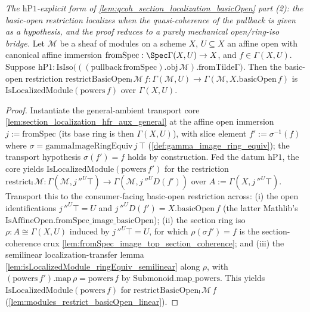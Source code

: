 \begin{lemma}

  \label{lem:isLocalizedModule_basicOpen_of_hP1}
  \textit{The $\mathrm{hP1}$-explicit form of \cref{lem:qcoh_section_localization_basicOpen} part (2):
  the basic-open restriction localizes when the quasi-coherence of the pullback is given as a hypothesis,
  and the proof reduces to a purely mechanical open/ring-iso bridge.}
  Let \(\mathcal{M}\) be a sheaf of modules on a scheme \(X\), \(U \subseteq X\) an affine open with
  canonical affine immersion \(\mathrm{fromSpec} : \Spec \Gamma(X,U) \to X\), and \(f \in \Gamma(X,U)\).
  Suppose
  \(\mathrm{hP1} : \mathrm{IsIso}\bigl(((\mathrm{pullback}\,\mathrm{fromSpec}).\mathrm{obj}\,
  \mathcal{M}).\mathrm{fromTildeΓ}\bigr)\). Then the basic-open restriction
  \(\mathrm{restrictBasicOpenₗ}\,\mathcal{M}\,f : \Gamma(\mathcal{M}, U) \to
  \Gamma(\mathcal{M}, X.\mathrm{basicOpen}\,f)\) is \(\mathrm{IsLocalizedModule}(\mathrm{powers}\,f)\) over
  \(\Gamma(X,U)\).
\end{lemma}
\begin{proof}
  Instantiate the general-ambient transport core \cref{lem:section_localization_hfr_aux_general} at the
  affine open immersion \(j := \mathrm{fromSpec}\) (its base ring is then \(\Gamma(X,U)\)), with slice
  element \(f' := \sigma^{-1}(f)\) where \(\sigma = \mathrm{gammaImageRingEquiv}\,j\,\top\)
  (\cref{def:gamma_image_ring_equiv}); the transport hypothesis \(\sigma(f') = f\) holds by construction.
  Fed the datum \(\mathrm{hP1}\), the core yields \(\mathrm{IsLocalizedModule}(\mathrm{powers}\,f')\) for
  the restriction \(\mathrm{restrictₗ}\,\mathcal{M} : \Gamma(\mathcal{M}, j\,''^{U}\top) \to
  \Gamma(\mathcal{M}, j\,''^{U}D(f'))\) over \(A := \Gamma(X, j\,''^{U}\top)\). Transport this to the
  consumer-facing basic-open restriction across: (i) the open identifications \(j\,''^{U}\top = U\) and
  \(j\,''^{U}D(f') = X.\mathrm{basicOpen}\,f\) (the latter Mathlib's
  \(\mathrm{IsAffineOpen.fromSpec\_image\_basicOpen}\)); (ii) the section ring iso \(\rho : A \cong
  \Gamma(X,U)\) induced by \(j\,''^{U}\top = U\), for which \(\rho(\sigma f') = f\) is the section-coherence
  crux \cref{lem:fromSpec_image_top_section_coherence}; and (iii) the semilinear localization-transfer
  lemma \cref{lem:isLocalizedModule_ringEquiv_semilinear} along \(\rho\), with
  \((\mathrm{powers}\,f').\mathrm{map}\,\rho = \mathrm{powers}\,f\) by \(\mathrm{Submonoid.map\_powers}\).
  This yields \(\mathrm{IsLocalizedModule}(\mathrm{powers}\,f)\) for
  \(\mathrm{restrictBasicOpenₗ}\,\mathcal{M}\,f\) (\cref{lem:modules_restrict_basicOpen_linear}).
\end{proof}

